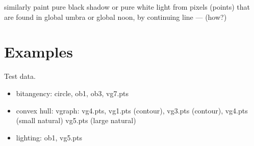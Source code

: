\documentclass[9pt,twocolumn]{article}
\newif\ifJournal
\begin{document}
similarly paint pure black shadow or pure white light
     from pixels (points) that are found in global umbra
     or global noon, by continuing line --- (how?)


\section{Examples}

Test data.
\begin{itemize}
\item bitangency: circle, ob1, ob3, vg7.pts
\item convex hull: vgraph: vg4.pts, vg1.pts (contour), vg3.pts (contour), vg4.pts (small natural)
	vg5.pts (large natural)
\item lighting: ob1, vg5.pts
\end{itemize}

\fi
			
\end{document}
